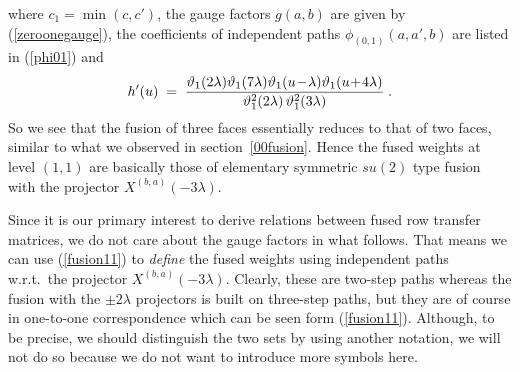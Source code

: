 \ee
where $c_1=\min(c,c')$, the gauge factors $g(a,b)$ are given
by (\ref{zeroonegauge}), the coefficients of independent paths
$\phi_{(0,1)}(a,a',b)$ are listed in (\ref{phi01}) and
\[
h'(u)\;=\;\frac{\vartheta_1(2\lambda)\vartheta_1(7\lambda)\vartheta_1(u\!-\!\lambda)\vartheta_1(u\!+\!4\lambda)}
     {\vartheta_{1}^{2}(2\lambda)\,\vartheta_{1}^{2}(3\lambda)}\;.
\]
So we see that the fusion of three faces essentially reduces
to that of two faces, similar to what we observed in section~\ref{00fusion}.
Hence the fused weights at level $(1,1)$ are basically those of
elementary symmetric $su(2)$ type fusion \cite{Zhou:94} with the projector
$X^{(b,a)}(-3\lambda)$.

Since it is our primary interest to derive relations between fused row
transfer matrices, we do not care about the gauge factors in what follows.
That means we can use (\ref{fusion11}) to {\em define\/}
the fused weights using independent paths w.r.t.\ the
projector $X^{(b,a)}(-3\lambda)$. Clearly, these are two-step paths whereas
the fusion with the $\pm 2\lambda$ projectors is built on three-step paths,
but they are of course in one-to-one correspondence which can be seen
form (\ref{fusion11}). Although, to be precise, we should distinguish the
two sets by using another notation, we will not do so because we do
not want to introduce more symbols here.

